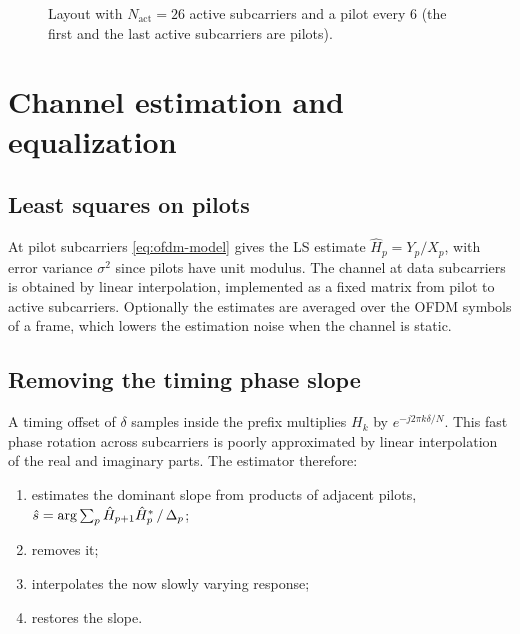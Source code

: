 \begin{figure}[htbp]
\centering
{}
\caption{Layout with $N_{\mathrm{act}}=26$ active subcarriers and a pilot every 6 (the first and the
last active subcarriers are pilots).}
\label{fig:ofdm-layout}
\end{figure}

\section{Channel estimation and equalization}
\subsection{Least squares on pilots}
At pilot subcarriers \cref{eq:ofdm-model} gives the LS estimate $\hat H_p=Y_p/X_p$, with error
variance $\sigma^2$ since pilots have unit modulus. The channel at data subcarriers is
obtained by linear interpolation, implemented as a fixed matrix from pilot to active
subcarriers. Optionally the estimates are averaged over the OFDM symbols of a frame, which
lowers the estimation noise when the channel is static.

\subsection{Removing the timing phase slope}
A timing offset of $\delta$ samples inside the prefix multiplies $H_k$ by $e^{-j2\pi k\delta/N}$.
This fast phase rotation across subcarriers is poorly approximated by linear interpolation of
the real and imaginary parts. The estimator therefore:
\begin{enumerate}
  \item estimates the dominant slope from products of adjacent pilots,
  $\hat s=\arg\sum_p\hat H_{p+1}\hat H_p^{*}\,/\,\Delta_p$;
  \item removes it;
  \item interpolates the now slowly varying response;
  \item restores the slope.
\end{enumerate}

